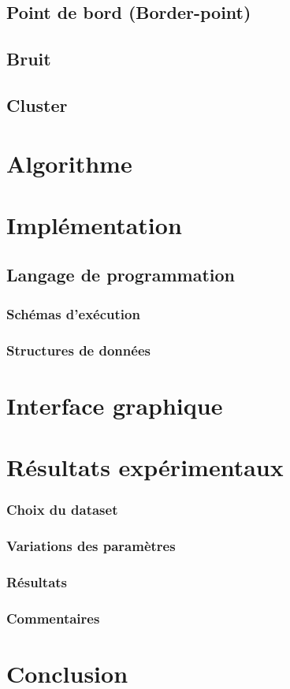 	\subsection{Point de bord (Border-point)}
	\paragraph{}
	\subsection{Bruit}
	\paragraph{}
	\subsection{Cluster}
	\paragraph{}

\section{Algorithme}
	\paragraph{}
	\section{Implémentation}
	\subsection{Langage de programmation}
	\subsubsection{Schémas d'exécution}
	\subsubsection{Structures de données}
\section{Interface graphique}

\section{Résultats expérimentaux}
	\subsubsection{Choix du dataset}
	\subsubsection{Variations des paramètres}
	\subsubsection{Résultats}
	\subsubsection{Commentaires}

\section{Conclusion}

